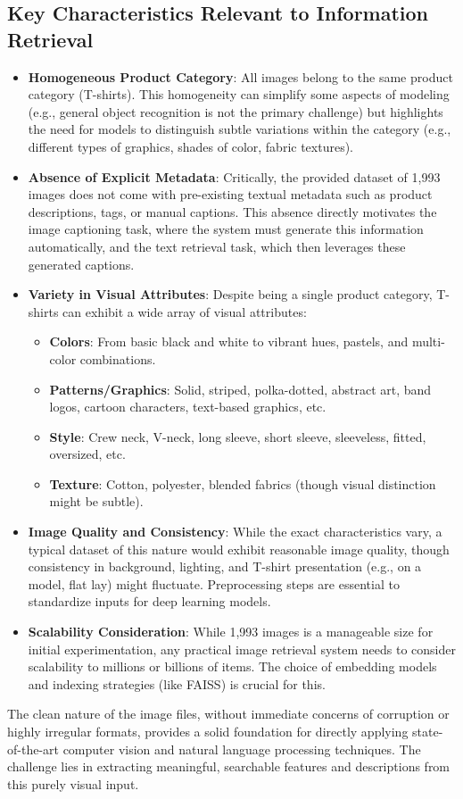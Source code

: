 \documentclass{article}
\begin{document}
\subsection{Key Characteristics Relevant to Information Retrieval}
\begin{itemize}
    \item \textbf{Homogeneous Product Category}: All images belong to the same product category (T-shirts). This homogeneity can simplify some aspects of modeling (e.g., general object recognition is not the primary challenge) but highlights the need for models to distinguish subtle variations within the category (e.g., different types of graphics, shades of color, fabric textures).
    \item \textbf{Absence of Explicit Metadata}: Critically, the provided dataset of 1,993 images does not come with pre-existing textual metadata such as product descriptions, tags, or manual captions. This absence directly motivates the image captioning task, where the system must generate this information automatically, and the text retrieval task, which then leverages these generated captions.
    \item \textbf{Variety in Visual Attributes}: Despite being a single product category, T-shirts can exhibit a wide array of visual attributes:
    \begin{itemize}
        \item \textbf{Colors}: From basic black and white to vibrant hues, pastels, and multi-color combinations.
        \item \textbf{Patterns/Graphics}: Solid, striped, polka-dotted, abstract art, band logos, cartoon characters, text-based graphics, etc.
        \item \textbf{Style}: Crew neck, V-neck, long sleeve, short sleeve, sleeveless, fitted, oversized, etc.
        \item \textbf{Texture}: Cotton, polyester, blended fabrics (though visual distinction might be subtle).
    \end{itemize}
    \item \textbf{Image Quality and Consistency}: While the exact characteristics vary, a typical dataset of this nature would exhibit reasonable image quality, though consistency in background, lighting, and T-shirt presentation (e.g., on a model, flat lay) might fluctuate. Preprocessing steps are essential to standardize inputs for deep learning models.
    \item \textbf{Scalability Consideration}: While 1,993 images is a manageable size for initial experimentation, any practical image retrieval system needs to consider scalability to millions or billions of items. The choice of embedding models and indexing strategies (like FAISS) is crucial for this.
\end{itemize}
The clean nature of the image files, without immediate concerns of corruption or highly irregular formats, provides a solid foundation for directly applying state-of-the-art computer vision and natural language processing techniques. The challenge lies in extracting meaningful, searchable features and descriptions from this purely visual input.
\end{document}
